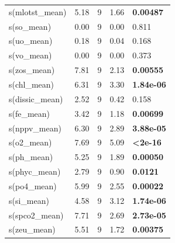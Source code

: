 \documentclass[a4paper,fleqn]{cas-sc}
\begin{document}
\begin{table}[width=\linewidth,cols=5,pos=!htbp]
\begin{tabular*}{\tblwidth}{@{} LLLLL @{}}
s(mlotst\_mean)   & 5.18 & 9 & 1.66  & \textbf{0.00487} \\
s(so\_mean)       & 0.00 & 9 & 0.00  & 0.811 \\
s(uo\_mean)       & 0.18 & 9 & 0.04  & 0.168 \\
s(vo\_mean)       & 0.00 & 9 & 0.00  & 0.373 \\
s(zos\_mean)      & 7.81 & 9 & 2.13  & \textbf{0.00555} \\
s(chl\_mean)      & 6.31 & 9 & 3.30  & \textbf{1.84e-06} \\
s(dissic\_mean)   & 2.52 & 9 & 0.42  & 0.158 \\
s(fe\_mean)       & 3.42 & 9 & 1.18  & \textbf{0.00699} \\
s(nppv\_mean)     & 6.30 & 9 & 2.89  & \textbf{3.88e-05} \\
s(o2\_mean)       & 7.69 & 9 & 5.09  & \textbf{<2e-16} \\
s(ph\_mean)       & 5.25 & 9 & 1.89  & \textbf{0.00050} \\
s(phyc\_mean)     & 2.79 & 9 & 0.90  & \textbf{0.0121} \\
s(po4\_mean)      & 5.99 & 9 & 2.55  & \textbf{0.00022} \\
s(si\_mean)       & 4.58 & 9 & 3.12  & \textbf{1.74e-06} \\
s(spco2\_mean)    & 7.71 & 9 & 2.69  & \textbf{2.73e-05} \\
s(zeu\_mean)      & 5.51 & 9 & 1.72  & \textbf{0.00375} \\
\bottomrule
\end{tabular*}
\label{tab:9}
\end{table}
\end{document}
